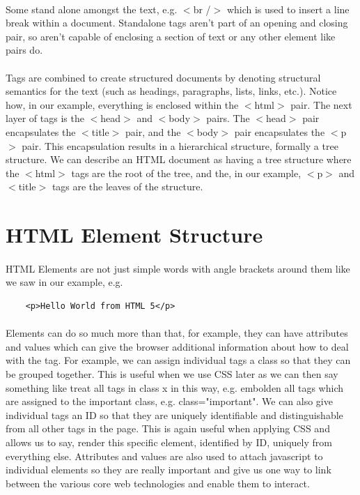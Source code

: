 \paragraph{} Some stand alone amongst the text, e.g. $<$br /$>$ which is used to insert a line break within a document. Standalone tags aren't part of an opening and closing pair, so aren't capable of enclosing a section of text or any other element like pairs do. 
\paragraph{} Tags are combined to create structured documents by denoting structural semantics for the text (such as headings, paragraphs, lists, links, etc.). Notice how, in our example, everything is enclosed within the $<$html$>$ pair. The next layer of tags is the $<$head$>$ and $<$body$>$ pairs. The $<$head$>$ pair encapsulates the $<$title$>$ pair, and the $<$body$>$ pair encapsulates the $<$p$>$ pair. This encapsulation results in a hierarchical structure, formally a tree structure. We can describe an  HTML document as having a tree structure where the $<$html$>$ tags are the root of the tree, and the, in our example, $<$p$>$ and $<$title$>$ tags are the leaves of the structure.

\section{HTML Element Structure}
\paragraph{} HTML Elements are not just simple words with angle brackets around them like we saw in our example, e.g.
\begin{lstlisting}
	<p>Hello World from HTML 5</p>
\end{lstlisting}
\paragraph{}Elements can do so much more than that, for example, they can have attributes and values which can give the browser additional information about how to deal with the tag. For example, we can assign individual tags a class so that they can be grouped together. This is useful when we use CSS later as we can then say something like treat all tags in class x in this way, e.g. embolden all tags which are assigned to the important class, e.g. class="important". We can also give individual tags an ID so that they are uniquely identifiable and distinguishable from all other tags in the page. This is again useful when applying CSS and allows us to say, render this specific element, identified by ID, uniquely from everything else. Attributes and values are also used to attach javascript to individual elements so they are really important and give us one way to link between the various core web technologies and enable them to interact. 

